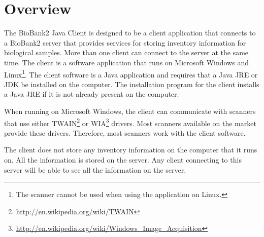 \chapter{Overview}
The BioBank2 Java Client is designed to be a client application that connects
to a BioBank2 server that provides services for storing inventory information
for biological samples. More than one client can connect to the server at the
same time. The client is a software application that runs on Microsoft Windows
and Linux\footnote{The scanner cannot be used when using the application on
  Linux.}. The client software is a Java application and requires that a Java
JRE or JDK be installed on the computer. The installation program for the
client installs a Java JRE if it is not already present on the computer.

When running on Microsoft Windows, the client can communicate with scanners
that use either TWAIN\footnote{\url{http://en.wikipedia.org/wiki/TWAIN}} or
WIA\footnote{\url{http://en.wikipedia.org/wiki/Windows_Image_Acquisition}}
drivers. Most scanners available on the market provide these
drivers. Therefore, most scanners work with the client software.

The client does not store any inventory information on the computer that it
runs on. All the information is stored on the server. Any client connecting to
this server will be able to see all the information on the server.

